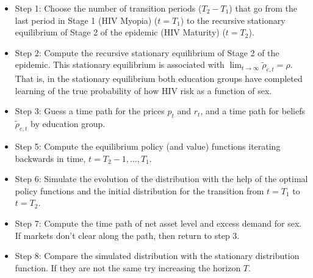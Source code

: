 \begin{itemize}
\item Step 1: Choose the number of transition periods ($T_2-T_1$) that go from the last  period in Stage 1 (HIV Myopia) ($t=T_1$) to the recursive stationary equilibrium of Stage 2 of the epidemic (HIV Maturity) ($t=T_2$).
\item Step 2: Compute the recursive stationary equilibrium of Stage 2 of the epidemic. This stationary equilibrium is associated with $\lim_{t \rightarrow \infty }\widetilde{\rho}_{e,t}=\rho$. That is, in the stationary equilibrium both education groups have completed learning of the true probability of how HIV risk as a function of sex.
\item Step 3: Guess a time path for the prices $p_{t}$ and $r_{t}$, and a time path for beliefs $\widetilde{\rho}_{e,t}$ by education group.
\item Step 5: Compute the equilibrium policy (and value) functions iterating backwards in time, $t = T_2-1,...,T_1$.
\item Step 6: Simulate the evolution of the distribution with the help of the optimal policy functions and the initial distribution for the transition from $t = T_1$ to $t = T_2$.
\item Step 7: Compute the time path of net asset level and excess demand for sex. If markets don't clear along the path, then return to step 3.
\item Step 8: Compare the simulated distribution  with the stationary distribution function. If they are not the same try increasing the horizon $T$.
\end{itemize}















